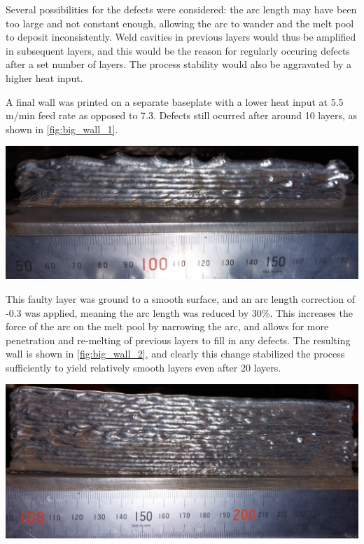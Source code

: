 Several possibilities for the defects were considered: the arc length may have been too large and not constant enough, allowing the arc to wander and the melt pool to deposit inconsistently. Weld cavities in previous layers would thus be amplified in subsequent layers, and this would be the reason for regularly occuring defects after a set number of layers. The process stability would also be aggravated by a higher heat input.

A final wall was printed on a separate baseplate with a lower heat input at 5.5 m/min feed rate as opposed to 7.3. Defects still ocurred after around 10 layers, as shown in \autoref{fig:big_wall_1}.

\begin{minipage}{\linewidth}
    \centering
    \includegraphics[width=\linewidth]{images/big_wall_1.jpg}
    \label{fig:big_wall_1}
\end{minipage}

This faulty layer was ground to a smooth surface, and an arc length correction of -0.3 was applied, meaning the arc length was reduced by 30\%. This increases the force of the arc on the melt pool by narrowing the arc, and allows for more penetration and re-melting of previous layers to fill in any defects. The resulting wall is shown in \autoref{fig:big_wall_2}, and clearly this change stabilized the process sufficiently to yield relatively smooth layers even after 20 layers.

\begin{minipage}{\linewidth}
    \centering
    \includegraphics[width=\linewidth]{images/big_wall_2.jpg}
    \label{fig:big_wall_2}
\end{minipage}


